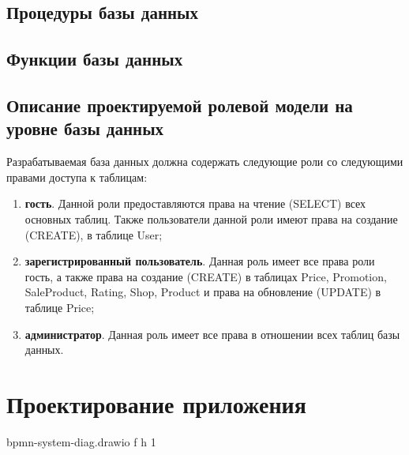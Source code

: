 \subsection{Процедуры базы данных}


\subsection{Функции базы данных}


\clearpage

\subsection{Описание проектируемой ролевой модели на уровне базы данных}

Разрабатываемая база данных должна содержать следующие роли со следующими правами доступа к таблицам:

\begin{enumerate}
	\item \textbf{гость}. Данной роли предоставляются права на чтение (SELECT) всех основных таблиц. Также пользователи данной роли имеют права на создание (CREATE), в таблице User;
	\item \textbf{зарегистрированный пользователь}. Данная роль имеет все права роли гость, а также права на создание (CREATE) в таблицах Price, Promotion, SaleProduct, Rating, Shop, Product и права на обновление (UPDATE) в таблице Price;
	\item \textbf{администратор}. Данная роль имеет все права в отношении всех таблиц базы данных.
\end{enumerate}
\clearpage

\section{Проектирование приложения}


{bpmn-system-diag.drawio} %
{f} %
{h} %
{1\textwidth} %
{} %

